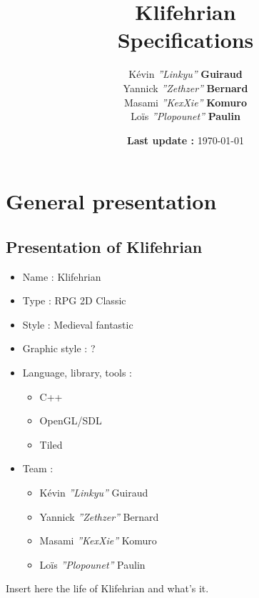 \documentclass[a4paper,12pt]{book}
\title{\Huge{Klifehrian} \\ \large{Specifications}}
\author{K\'{e}vin \textit{''Linkyu''} \textbf{Guiraud} \\ Yannick \textit{''Zethzer''} \textbf{Bernard} \\ Masami \textit{''KexXie''} \textbf{Komuro} \\ Lo\"{i}s \textit{''Plopounet''} \textbf{Paulin}}
\date{\textbf{Last update :} \today}
\begin{document}
\maketitle
\thispagestyle{empty}
\setcounter{page}{0}
\part{General presentation}
\chapter{Presentation of Klifehrian}
\begin{itemize}
\item Name : Klifehrian
\item Type : RPG 2D Classic
\item Style : Medieval fantastic
\item Graphic style : ?
\item Language, library, tools :
\begin{itemize}
\item C++
\item OpenGL/SDL
\item Tiled
\end{itemize}
\item Team :
\begin{itemize}
\item K\'{e}vin \textit{''Linkyu''} Guiraud
\item Yannick \textit{''Zethzer''} Bernard
\item Masami \textit{''KexXie''} Komuro
\item Lo\"{i}s \textit{''Plopounet''} Paulin
\end{itemize}
\end{itemize}
\newpage Insert here the life of Klifehrian and what's it.
\end{document}
